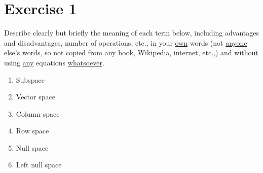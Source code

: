 \section{Exercise 1}
Describe clearly but briefly the meaning of each term below, including
advantages and disadvantages, number of operations, etc.,  in your
\underline{own} words (not \underline{anyone} else's words, so not copied
from any book, Wikipedia, internet, etc.,) and without using
\underline{any} equations \underline{whatsoever}.

\begin{enumerate}[label=(\alph*)]
    \item Subspace
    \item Vector space
    \item Column space
    \item Row space
    \item Null space
    \item Left null space
\end{enumerate}

